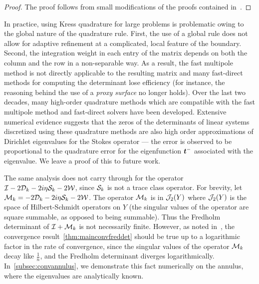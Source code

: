 \begin{proof}
  The proof follows from small modifications of the
  proofs contained in~\cite{zhao2015robust}. 
\end{proof}

\begin{remark}
In practice, using Kress quadrature for large
problems is problematic owing to the global
nature of the quadrature rule.
%
First, the use of a global rule does not allow
for adaptive refinement at a complicated, local
feature of the boundary.
%
Second, the integration weight in each entry
of the matrix depends on both the column and the row
in a non-separable way.
%
As a result, the fast multipole method is not
directly applicable to the resulting matrix
and many fast-direct methods for computing
the determinant lose efficiency (for
instance, the reasoning behind the use of a
{\em proxy surface} \cite{cheng2005compression}
no longer holds).
%
Over the last two decades, many high-order quadrature
methods which are compatible with
the fast multipole method and fast-direct solvers
have been developed.
%
Extensive numerical evidence suggests that the zeros of the 
determinants of linear systems discretized using 
these quadrature methods are also high order approximations
of Dirichlet eigenvalues for the Stokes operator ---
the error is observed to be proportional to the quadrature error
for the eigenfunction ${\boldsymbol t}^{-}$ associated with the eigenvalue.
We leave a proof of this to future work.
\end{remark}

\begin{remark}
The same analysis does not carry through for the operator
$\mathcal I - 2 {\mathcal D}_{k} - 2i\eta {\mathcal S}_{k} - 2{\mathcal W}$, 
since ${\mathcal S}_{k}$ is not a trace class operator.
For brevity, let ${\mathcal M}_{k} = -2{\mathcal D}_{k} - 2i\eta {\mathcal S}_{k} - 2{\mathcal W}$.
The operator ${\mathcal M}_{k}$ is 
in ${\mathcal J}_{2}(Y)$ where
${\mathcal J}_{2}(Y)$ is the space of Hilbert-Schmidt operators
on $Y$ (the singular values of the operator are square
summable, as opposed to being summable).
Thus the Fredholm determinant of $\mathcal I + {\mathcal M}_{k}$
is not necessarily finite. 
However, as noted in~\cite{zhao2015robust}, the convergence
result~\cref{thm:mainconvfreddet}
should be true up to a logarithmic factor in the rate
of convergence, since the singular values of the operator
${\mathcal M}_{k}$ decay like $\frac{1}{n}$, and the
Fredholm determinant diverges logarithmically. 
In~\cref{subsec:convannulus}, we demonstrate this fact
numerically on the annulus, where the eigenvalues are
analytically known. 
\end{remark}
